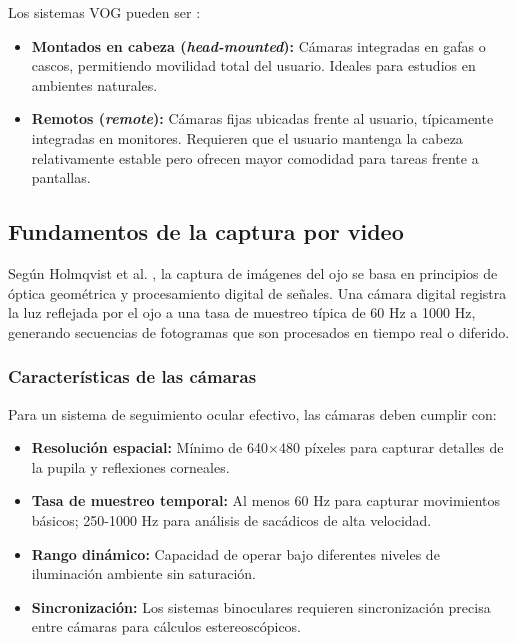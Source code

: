 Los sistemas VOG pueden ser \cite{duchowski2017}:

\begin{itemize}
	\item \textbf{Montados en cabeza (\textit{head-mounted}):} Cámaras integradas en gafas o cascos, permitiendo movilidad total del usuario. Ideales para estudios en ambientes naturales.
	
	\item \textbf{Remotos (\textit{remote}):} Cámaras fijas ubicadas frente al usuario, típicamente integradas en monitores. Requieren que el usuario mantenga la cabeza relativamente estable pero ofrecen mayor comodidad para tareas frente a pantallas.
\end{itemize}

\subsection{Fundamentos de la captura por video}

Según Holmqvist et al. \cite{holmqvist2011eye}, la captura de imágenes del ojo se basa en principios de óptica geométrica y procesamiento digital de señales. Una cámara digital registra la luz reflejada por el ojo a una tasa de muestreo típica de 60 Hz a 1000 Hz, generando secuencias de fotogramas que son procesados en tiempo real o diferido.

\subsubsection{Características de las cámaras}

Para un sistema de seguimiento ocular efectivo, las cámaras deben cumplir con:

\begin{itemize}
	\item \textbf{Resolución espacial:} Mínimo de 640×480 píxeles para capturar detalles de la pupila y reflexiones corneales.
	
	\item \textbf{Tasa de muestreo temporal:} Al menos 60 Hz para capturar movimientos básicos; 250-1000 Hz para análisis de sacádicos de alta velocidad.
	
	\item \textbf{Rango dinámico:} Capacidad de operar bajo diferentes niveles de iluminación ambiente sin saturación.
	
	\item \textbf{Sincronización:} Los sistemas binoculares requieren sincronización precisa entre cámaras para cálculos estereoscópicos.
\end{itemize}


